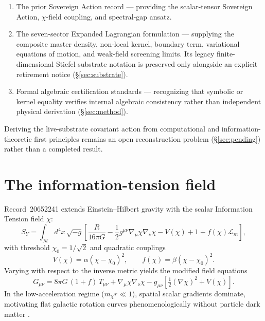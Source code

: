 \documentclass{alienfolio}
\begin{document}
\begin{enumerate}
\item The prior Sovereign Action record 
\cite{rec20652241}  --- providing the scalar-tensor
Sovereign Action, $\chi$-field coupling, and spectral-gap ansatz.
\item The seven-sector Expanded Lagrangian formulation 
--- supplying the composite master density, non-local kernel, boundary
term, variational equations of motion, and weak-field screening limits.
Its legacy finite-dimensional Stiefel substrate notation is preserved
only alongside an explicit retirement notice (\S\ref{sec:substrate}).
\item Formal algebraic certification standards  ---
recognizing that symbolic or kernel equality verifies internal algebraic
consistency rather than independent physical derivation (\S\ref{sec:method}).
\end{enumerate}

Deriving the live-substrate covariant action from computational and
information-theoretic first principles remains an open reconstruction
problem (\S\ref{sec:pending}) rather than a completed result.

\section{The information-tension field}
\label{sec:chi}

Record~20652241 \cite{rec20652241} extends Einstein--Hilbert gravity with
the scalar Information Tension field $\chi$:
\begin{equation}
S_Y = \int_{\mathcal{M}} d^4x\,\sqrt{-g}\left[
\frac{R}{16\pi G} - \frac{1}{2}g^{\mu\nu}\nabla_\mu\chi\nabla_\nu\chi
- V(\chi) + 1 + f(\chi)\mathcal{L}_m \right],
\end{equation}
with threshold $\chi_0 = 1/\sqrt{2}$ and quadratic couplings
\begin{equation}
V(\chi) = \alpha(\chi-\chi_0)^2, \qquad
f(\chi) = \beta(\chi-\chi_0)^2 .
\end{equation}
Varying with respect to the inverse metric yields the modified field
equations
\begin{equation}
G_{\mu\nu} = 8\pi G\,(1+f)\,T_{\mu\nu}
+ \nabla_\mu\chi\nabla_\nu\chi
- g_{\mu\nu}\left[\tfrac{1}{2}(\nabla\chi)^2 + V(\chi)\right].
\end{equation}
In the low-acceleration regime ($m_\chi r \ll 1$), spatial scalar
gradients dominate, motivating flat galactic rotation curves
phenomenologically without particle dark matter .
\end{document}
